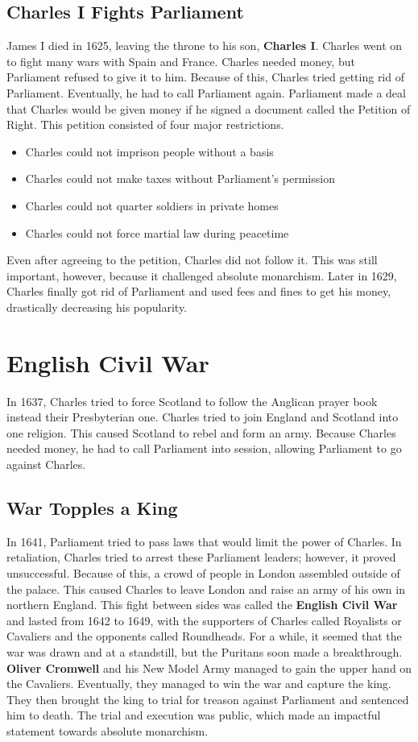 \documentclass[11pt]{article}
\begin{document}
\subsection{Charles I Fights Parliament}
\label{sec:org2fe2a91}
James I died in 1625, leaving the throne to his son, \textbf{Charles I}. Charles went on to fight many wars with Spain and France. Charles needed money, but Parliament refused to give it to him. Because of this, Charles tried getting rid of Parliament. Eventually, he had to call Parliament again. Parliament made a deal that Charles would be given money if he signed a document called the Petition of Right. This petition consisted of four major restrictions.
\begin{itemize}
\item Charles could not imprison people without a basis
\item Charles could not make taxes without Parliament's permission
\item Charles could not quarter soldiers in private homes
\item Charles could not force martial law during peacetime
\end{itemize}
Even after agreeing to the petition, Charles did not follow it. This was still important, however, because it challenged absolute monarchism. Later in 1629, Charles finally got rid of Parliament and used fees and fines to get his money, drastically decreasing his popularity.
\section{English Civil War}
\label{sec:org534d38f}
In 1637, Charles tried to force Scotland to follow the Anglican prayer book instead their Presbyterian one. Charles tried to join England and Scotland into one religion. This caused Scotland to rebel and form an army. Because Charles needed money, he had to call Parliament into session, allowing Parliament to go against Charles.
\subsection{War Topples a King}
\label{sec:orgd0c73f3}
In 1641, Parliament tried to pass laws that would limit the power of Charles. In retaliation, Charles tried to arrest these Parliament leaders; however, it proved unsuccessful. Because of this, a crowd of people in London assembled outside of the palace. This caused Charles to leave London and raise an army of his own in northern England. This fight between sides was called the \textbf{English Civil War} and lasted from 1642 to 1649, with the supporters of Charles called Royalists or Cavaliers and the opponents called Roundheads. For a while, it seemed that the war was drawn and at a standstill, but the Puritans soon made a breakthrough. \textbf{Oliver Cromwell} and his New Model Army managed to gain the upper hand on the Cavaliers. Eventually, they managed to win the war and capture the king. They then brought the king to trial for treason against Parliament and sentenced him to death. The trial and execution was public, which made an impactful statement towards absolute monarchism.
\end{document}
